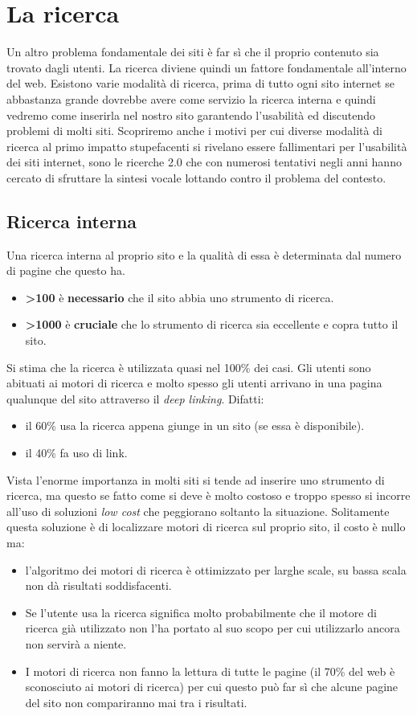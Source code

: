 
\chapter{La ricerca}
	Un altro problema fondamentale dei siti è far sì che il proprio contenuto sia trovato dagli utenti. La ricerca diviene quindi un fattore fondamentale all'interno del web. Esistono varie modalità di ricerca, prima di tutto ogni sito internet se abbastanza grande dovrebbe avere come servizio la ricerca interna e quindi vedremo come inserirla nel nostro sito garantendo l'usabilità ed discutendo problemi di molti siti. Scopriremo anche i motivi per cui diverse modalità di ricerca al primo impatto stupefacenti si rivelano essere fallimentari per l'usabilità dei siti internet, sono le ricerche 2.0 che con numerosi tentativi negli anni hanno cercato di sfruttare la sintesi vocale lottando contro il problema del contesto.

	\section{Ricerca interna}
		Una ricerca interna al proprio sito e la qualità di essa è determinata dal numero di pagine che questo ha.
		\begin{itemize}
			\item \textbf{>100} è \textbf{necessario} che il sito abbia uno strumento di ricerca.
			\item \textbf{>1000} è \textbf{cruciale} che lo strumento di ricerca sia eccellente e copra tutto il sito.
		\end{itemize}
		Si stima che la ricerca è utilizzata quasi nel 100\% dei casi. Gli utenti sono abituati ai motori di ricerca e molto spesso gli utenti arrivano in una pagina qualunque del sito attraverso il \emph{deep linking}. Difatti:
		\begin{itemize}
			\item il 60\% usa la ricerca appena giunge in un sito (se essa è disponibile).
			\item il 40\% fa uso di link.
		\end{itemize}
		
		Vista l'enorme importanza in molti siti si tende ad inserire uno strumento di ricerca, ma questo se fatto come si deve è molto costoso e troppo spesso si incorre all'uso di soluzioni \emph{low cost} che peggiorano soltanto la situazione. Solitamente questa soluzione è di localizzare motori di ricerca sul proprio sito, il costo è nullo ma:
		\begin{itemize}
			\item l'algoritmo dei motori di ricerca è ottimizzato per larghe scale, su bassa scala non dà risultati soddisfacenti.
			\item Se l'utente usa la ricerca significa molto probabilmente che il motore di ricerca già utilizzato non l'ha portato al suo scopo per cui utilizzarlo ancora non servirà a niente.
			\item I motori di ricerca non fanno la lettura di tutte le pagine (il 70\% del web è sconosciuto ai motori di ricerca) per cui questo può far sì che alcune pagine del sito non compariranno mai tra i risultati.
		\end{itemize}			
	
